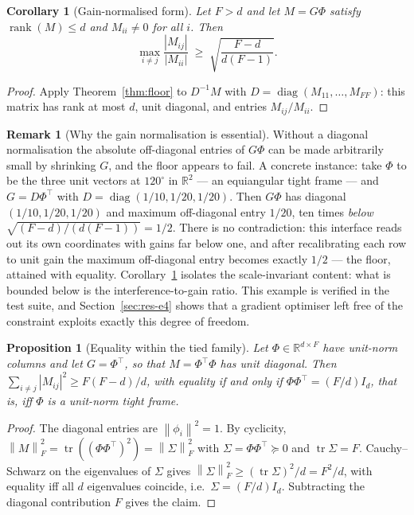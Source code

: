 \documentclass[preprint,12pt]{elsarticle}
\newtheorem{proposition}[theorem]{Proposition}
\newtheorem{corollary}[theorem]{Corollary}
\theoremstyle{definition}
\newtheorem{remark}[theorem]{Remark}
\newcommand{\R}{\mathbb{R}}
\newcommand{\norm}[1]{\left\lVert #1 \right\rVert}
\begin{document}
\begin{corollary}[Gain-normalised form]
\label{cor:calibfree}
Let $F>d$ and let $M=G\Phi$ satisfy $\operatorname{rank}(M)\le d$ and $M_{ii}\neq0$ for all
$i$. Then
\[
  \max_{i\neq j}\frac{|M_{ij}|}{|M_{ii}|}\;\ge\;\sqrt{\frac{F-d}{d(F-1)}}.
\]
\end{corollary}

\begin{proof}
Apply Theorem~\ref{thm:floor} to $D^{-1}M$ with $D=\operatorname{diag}(M_{11},\dots,M_{FF})$:
this matrix has rank at most $d$, unit diagonal, and entries $M_{ij}/M_{ii}$.
\end{proof}

\begin{remark}[Why the gain normalisation is essential]
\label{rem:calib}
Without a diagonal normalisation the absolute off-diagonal entries of $G\Phi$ can be made
arbitrarily small by shrinking $G$, and the floor appears to fail. A concrete instance: take
$\Phi$ to be the three unit vectors at $120^{\circ}$ in $\R^2$ --- an equiangular tight frame
--- and $G=D\Phi^{\top}$ with $D=\operatorname{diag}(1/10,1/20,1/20)$. Then $G\Phi$ has
diagonal $(1/10,1/20,1/20)$ and maximum off-diagonal entry $1/20$, ten times \emph{below}
$\sqrt{(F-d)/(d(F-1))}=1/2$. There is no contradiction: this interface reads out its own
coordinates with gains far below one, and after recalibrating each row to unit gain the
maximum off-diagonal entry becomes exactly $1/2$ --- the floor, attained with equality.
Corollary~\ref{cor:calibfree} isolates the scale-invariant content: what is bounded below is
the interference-to-gain ratio. This example is verified in the test suite, and
Section~\ref{sec:res-e4} shows that a gradient optimiser left free of the constraint exploits
exactly this degree of freedom.
\end{remark}

\begin{proposition}[Equality within the tied family]
\label{prop:tight}
Let $\Phi\in\R^{d\times F}$ have unit-norm columns and let $G=\Phi^{\top}$, so that
$M=\Phi^{\top}\Phi$ has unit diagonal. Then $\sum_{i\neq j}|M_{ij}|^2\ge F(F-d)/d$, with
equality \emph{if and only if} $\Phi\Phi^{\top}=(F/d)I_d$, that is, iff $\Phi$ is a unit-norm
tight frame.
\end{proposition}

\begin{proof}
The diagonal entries are $\norm{\phi_i}^2=1$. By cyclicity,
$\norm{M}_F^2=\operatorname{tr}((\Phi\Phi^{\top})^2)=\norm{\Sigma}_F^2$ with
$\Sigma=\Phi\Phi^{\top}\succeq0$ and $\operatorname{tr}\Sigma=F$. Cauchy--Schwarz on the
eigenvalues of $\Sigma$ gives $\norm{\Sigma}_F^2\ge(\operatorname{tr}\Sigma)^2/d=F^2/d$, with
equality iff all $d$ eigenvalues coincide, i.e.\ $\Sigma=(F/d)I_d$. Subtracting the diagonal
contribution $F$ gives the claim.
\end{proof}
\end{document}
